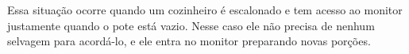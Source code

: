 \documentclass[11pt,a4paper]{article}
\begin{document}
Essa situação ocorre quando um cozinheiro é escalonado e tem acesso ao monitor justamente quando
o pote está vazio. Nesse caso ele não precisa de nenhum selvagem para acordá-lo, e ele entra no
monitor preparando novas porções. 


\end{document}
